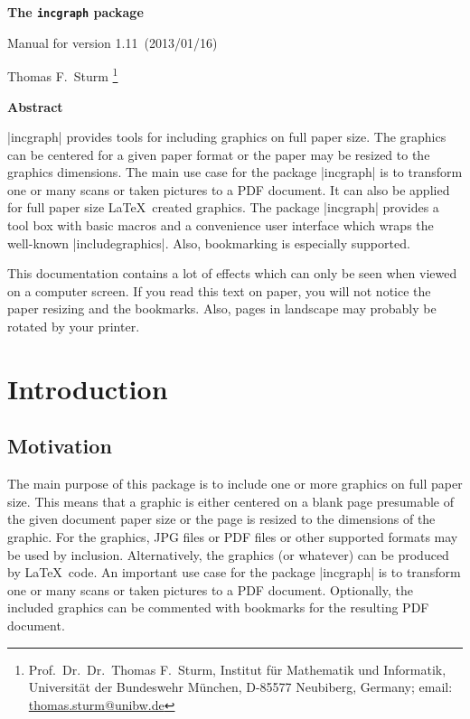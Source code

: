 \documentclass[a4paper,11pt]{ltxdoc}
\def\version{1.11}%
\def\datum{2013/01/16}%
\begin{document}
\begin{center}
\vspace*{5mm}\par
{\bfseries\LARGE The \texttt{incgraph} package\par}
{\large Manual for version \version\ (\datum)\par}\bigskip
{\large Thomas F.~Sturm%
  \footnote{Prof.~Dr.~Dr.~Thomas F.~Sturm, Institut f\"{u}r Mathematik und Informatik,
    Universit\"{a}t der Bundeswehr M\"{u}nchen, D-85577 Neubiberg, Germany;
     email: \href{mailto:thomas.sturm@unibw.de}{thomas.sturm@unibw.de}} }
\end{center}
\bigskip
\begin{absquote}
  \begin{center}\bfseries Abstract\end{center}
  |incgraph| provides tools for including graphics on full paper size.
  The graphics can be centered for a given paper format or the paper may be
  resized to the graphics dimensions.
  The main use case for the package |incgraph| is to transform one or many scans
  or taken pictures to a PDF document. It can also be applied for full paper size
  \LaTeX\ created graphics.
  The package |incgraph| provides a tool box with basic macros and a
  convenience user interface which wraps the well-known |includegraphics|.
  Also, bookmarking is especially supported.
\end{absquote}


\tableofcontents

\begin{inctext}[paper=graphics]
  \begin{tcolorbox}[title={Caveat\hfill --- Page \thepage\ ---},
    colframe=red!65!black,colback=red!10!white,fonttitle=\Large\bfseries,
    fontupper=\large,arc=0mm]
    This documentation contains a lot of effects which can only be seen
    when viewed on a computer screen. If you read this text on paper, you
    will not notice the paper resizing and the bookmarks. Also, pages in landscape may probably
    be rotated by your printer.
  \end{tcolorbox}
\end{inctext}


\section{Introduction}
\subsection{Motivation}
The main purpose of this package is to include one or more graphics on full
paper size. This means that a graphic is either centered on a blank page
presumable of the given document paper size or the page is resized
to the dimensions of the graphic.
For the graphics, JPG files or PDF files or other supported formats may be
used by inclusion. Alternatively, the graphics (or whatever) can be produced
by \LaTeX\ code.
An important use case for the package |incgraph| is to transform one or many scans
or taken pictures to a PDF document. Optionally, the included graphics can
be commented with bookmarks for the resulting PDF document.
\end{document}
